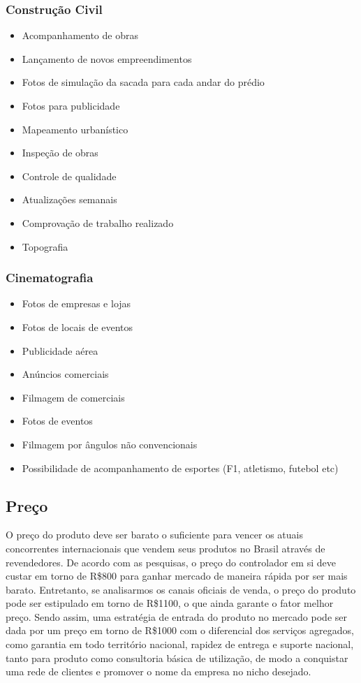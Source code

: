 \subsubsection*{Construção Civil}

\begin{itemize}
	\item Acompanhamento de obras
	\item Lançamento de novos empreendimentos
	\item Fotos de simulação da sacada para cada andar do prédio
	\item Fotos para publicidade
	\item Mapeamento urbanístico
	\item Inspeção de obras
	\item Controle de qualidade
	\item Atualizações semanais
	\item Comprovação de trabalho realizado
	\item Topografia
\end{itemize}

\subsubsection*{Cinematografia}

\begin{itemize}
	\item Fotos de empresas e lojas
	\item Fotos de locais de eventos
	\item Publicidade aérea
	\item Anúncios comerciais
	\item Filmagem de comerciais
	\item Fotos de eventos
	\item Filmagem por ângulos não convencionais
	\item Possibilidade de acompanhamento de esportes (F1, atletismo, futebol etc)
\end{itemize}

\subsection{Preço}


O preço do produto deve ser barato o suficiente para vencer os atuais concorrentes
internacionais que vendem seus produtos no Brasil através de revendedores. 
De acordo com as pesquisas, o preço do controlador em si deve custar em torno 
de R\$800 para ganhar mercado de maneira rápida por ser mais barato. Entretanto, 
se analisarmos os canais oficiais de venda, o preço do produto pode ser estipulado 
em torno de R\$1100, o que ainda garante o fator melhor preço. Sendo assim, uma estratégia 
de entrada do produto no mercado pode ser dada por um preço em torno de R\$1000 com o 
diferencial dos serviços agregados, como garantia em todo território nacional, 
rapidez de entrega e suporte nacional, tanto para produto como consultoria básica 
de utilização, de modo a conquistar uma rede de clientes e promover o nome da empresa no nicho desejado.

